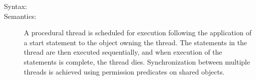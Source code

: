 \documentclass[\pformat,12pt]{article}
\begin{document}
\begin{description}
\item[Syntax:]  




\item[Semantics:] \mbox{} 
A procedural thread is scheduled for execution following the
application of a start statement to the object owning the thread. The
statements in the thread are then executed sequentially, and when
execution of the statements is complete, the thread
dies. Synchronization between multiple threads is achieved using
permission predicates on shared objects.
%
%

\end{description}
\end{document}
